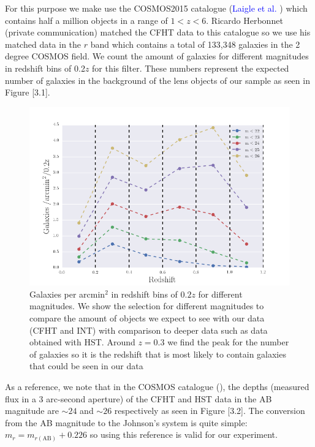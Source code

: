 For this purpose we make use the COSMOS2015 catalogue (\textcolor{blue}{Laigle et al.} \citeyear{Reference21}) which contains half a million objects in a range of $1<z<6$. Ricardo Herbonnet (private communication) matched the CFHT data to this catalogue so we use his matched data in the $r$ band which contains a total of 133,348 galaxies in the 2 degree COSMOS field. We count the amount of galaxies for different magnitudes in redshift bins of 0.2$z$ for this filter. These numbers represent the expected number of galaxies in the background of the lens objects of our sample as seen in Figure [3.1]. 

\begin{figure}[H]
\centering
\includegraphics[width=12cm]{images/galaxies_per_arcmin.png}
\caption[Galaxies per arcmin]{Galaxies per arcmin$^2$ in redshift bins of $0.2z$ for different magnitudes. We show the selection for different magnitudes to compare the amount of objects we expect to see with our data (CFHT and INT) with comparison to deeper data such as data obtained with HST. Around $z=0.3$ we find the peak for the number of galaxies so it is the redshift that is most likely to contain galaxies that could be seen in our data}
\end{figure}

As a reference, we note that in the COSMOS catalogue (\citeyear{Reference35}), the depths (measured flux in a 3 arc-second aperture) of the CFHT and HST data in the AB magnitude are $\sim  24$ and $\sim 26$ respectively as seen in Figure [3.2]. The conversion from the AB magnitude to the Johnson's system is quite simple: $m_{r} =   m_{r(\text{AB})} + 0.226$ so using this reference is valid for our experiment.

